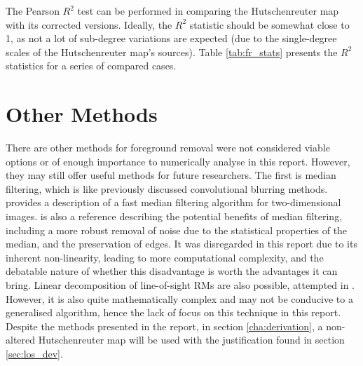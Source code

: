 The Pearson $R^2$ test can be performed in comparing the Hutschenreuter map with its corrected versions. Ideally, the $R^2$ statistic should be somewhat close to 1, as not a lot of sub-degree variations are expected (due to the single-degree scales of the Hutschenreuter map's sources). Table \ref{tab:fr_stats} presents the $R^2$ statistics for a series of compared cases.


\section{Other Methods}
\label{sec:other_methods}

There are other methods for foreground removal were not considered viable options or of enough importance to numerically analyse in this report. However, they may still offer useful methods for future researchers. The first is median filtering, which is like previously discussed convolutional blurring methods. \cite{ID39} provides a description of a fast median filtering algorithm for two-dimensional images. \cite{ID40} is also a reference describing the potential benefits of median filtering, including a more robust removal of noise due to the statistical properties of the median, and the preservation of edges. It was disregarded in this report due to its inherent non-linearity, leading to more computational complexity, and the debatable nature of whether this disadvantage is worth the advantages it can bring. Linear decomposition of line-of-sight RMs are also possible, attempted in \cite{ID21}. However, it is also quite mathematically complex and may not be conducive to a generalised algorithm, hence the lack of focus on this technique in this report. Despite the methods presented in the report, in section \ref{cha:derivation}, a non-altered Hutschenreuter map will be used with the justification found in section \ref{sec:los_dev}.


